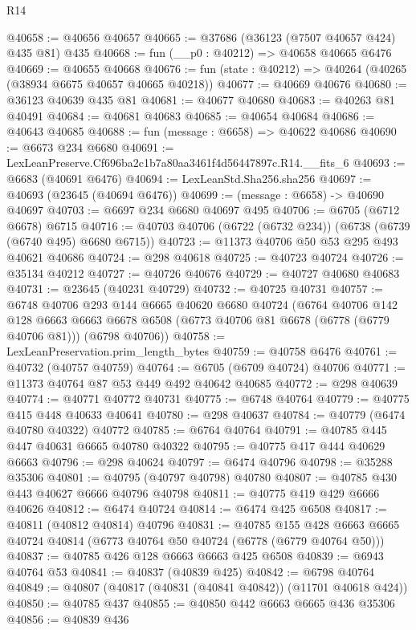 \begin{lexlean}{R14}
\begin{coremodule}
@40658 := @40656 @40657
@40665 := @37686 (@36123 (@7507 @40657 @424) @435 @81) @435
@40668 := fun (__p0 : @40212) => @40658 @40665 @6476
@40669 := @40655 @40668
@40676 := fun (state : @40212) => @40264 (@40265 (@38934 @6675 @40657 @40665 @40218))
@40677 := @40669 @40676
@40680 := @36123 @40639 @435 @81
@40681 := @40677 @40680
@40683 := @40263 @81 @40491
@40684 := @40681 @40683
@40685 := @40654 @40684
@40686 := @40643 @40685
@40688 := fun (message : @6658) => @40622 @40686
@40690 := @6673 @234 @6680
@40691 := LexLeanPreserve.Cf696ba2c1b7a80aa3461f4d56447897c.R14.__fits_6
@40693 := @6683 (@40691 @6476)
@40694 := LexLeanStd.Sha256.sha256
@40697 := @40693 (@23645 (@40694 @6476))
@40699 := (message : @6658) -> @40690 @40697
@40703 := @6697 @234 @6680 @40697 @495
@40706 := @6705 (@6712 @6678) @6715
@40716 := @40703 @40706 (@6722 (@6732 @234)) (@6738 (@6739 (@6740 @495) @6680 @6715))
@40723 := @11373 @40706 @50 @53 @295 @493 @40621 @40686
@40724 := @298 @40618
@40725 := @40723 @40724
@40726 := @35134 @40212
@40727 := @40726 @40676
@40729 := @40727 @40680 @40683
@40731 := @23645 (@40231 @40729)
@40732 := @40725 @40731
@40757 := @6748
    @40706
    @293
    @144
    @6665
    @40620
    @6680
    @40724
    (@6764
      @40706
      @142
      @128
      @6663
      @6663
      @6678
      @6508
      (@6773 @40706 @81 @6678 (@6778 (@6779 @40706 @81)))
      (@6798 @40706))
@40758 := LexLeanPreservation.prim_length_bytes
@40759 := @40758 @6476
@40761 := @40732 (@40757 @40759)
@40764 := @6705 (@6709 @40724) @40706
@40771 := @11373 @40764 @87 @53 @449 @492 @40642 @40685
@40772 := @298 @40639
@40774 := @40771 @40772 @40731
@40775 := @6748 @40764
@40779 := @40775 @415 @448 @40633 @40641
@40780 := @298 @40637
@40784 := @40779 (@6474 @40780 @40322) @40772
@40785 := @6764 @40764
@40791 := @40785 @445 @447 @40631 @6665 @40780 @40322
@40795 := @40775 @417 @444 @40629 @6663
@40796 := @298 @40624
@40797 := @6474 @40796
@40798 := @35288 @35306
@40801 := @40795 (@40797 @40798) @40780
@40807 := @40785 @430 @443 @40627 @6666 @40796 @40798
@40811 := @40775 @419 @429 @6666 @40626
@40812 := @6474 @40724
@40814 := @6474 @425 @6508
@40817 := @40811 (@40812 @40814) @40796
@40831 := @40785
    @155
    @428
    @6663
    @6665
    @40724
    @40814
    (@6773 @40764 @50 @40724 (@6778 (@6779 @40764 @50)))
@40837 := @40785 @426 @128 @6663 @6663 @425 @6508
@40839 := @6943 @40764 @53
@40841 := @40837 (@40839 @425)
@40842 := @6798 @40764
@40849 := @40807 (@40817 (@40831 (@40841 @40842)) (@11701 @40618 @424))
@40850 := @40785 @437
@40855 := @40850 @442 @6663 @6665 @436 @35306
@40856 := @40839 @436

\end{coremodule}
\end{lexlean}
